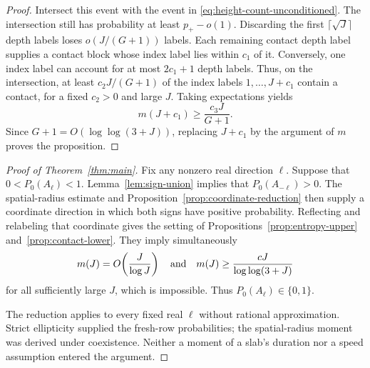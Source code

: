 \begin{proof}
Intersect this event with the event in
\eqref{eq:height-count-unconditioned}.  The intersection still has
probability at least $p_+-o(1)$.  Discarding the first
$\lceil\sqrt J\rceil$ depth labels loses
$o(J/(G+1))$ labels.  Each remaining contact depth label supplies a
contact block whose index label lies within $c_1$ of it.  Conversely,
one index label can account for at most $2c_1+1$ depth labels.
Thus, on the intersection, at least $c_2J/(G+1)$ of the index labels
$1,\ldots,J+c_1$ contain a contact, for a fixed $c_2>0$ and large
$J$.  Taking expectations yields
\[
 m(J+c_1)\ge\frac{c_3J}{G+1}.
\]
Since $G+1=O(\log\log(3+J))$, replacing $J+c_1$ by the argument
of $m$ proves the proposition.
\end{proof}

\begin{proof}[Proof of Theorem~\ref{thm:main}]
Fix any nonzero real direction $\ell$.  Suppose that
$0<P_0(A_\ell)<1$.  Lemma~\ref{lem:sign-union} implies that
$P_0(A_{-\ell})>0$.  The spatial-radius estimate and
Proposition~\ref{prop:coordinate-reduction} then supply a coordinate
direction in which both signs have positive probability.  Reflecting
and relabeling that coordinate gives the setting of
Propositions~\ref{prop:entropy-upper} and~\ref{prop:contact-lower}.
They imply simultaneously
\[
 m(J)=O\!\left(\frac{J}{\log J}\right)
 \quad\hbox{and}\quad
 m(J)\ge\frac{cJ}{\log\log(3+J)}
\]
for all sufficiently large $J$, which is impossible.  Thus
$P_0(A_\ell)\in\{0,1\}$.

The reduction applies to every fixed real $\ell$ without rational
approximation.  Strict ellipticity supplied the fresh-row probabilities;
the spatial-radius moment was derived under coexistence.  Neither a
moment of a slab's duration nor a speed assumption entered the argument.
\end{proof}
